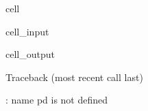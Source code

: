 \documentclass[letterpaper,10pt,french]{sphinxmanual}
\begin{document}
\begin{sphinxuseclass}{cell}
\begin{sphinxuseclass}{cell_input}
\begin{sphinxVerbatim}[commandchars=\\\{\}]
  
\end{sphinxVerbatim}

\end{sphinxuseclass}
\begin{sphinxuseclass}{cell_output}
\begin{sphinxVerbatim}[commandchars=\\\{\}]
Traceback (most recent call last)
  \PYG{p}{[}\PYG{p}{]}  
   

: name \PYGZsq{}pd\PYGZsq{} is not defined
\end{sphinxVerbatim}

\end{sphinxuseclass}
\end{sphinxuseclass}
\end{document}
